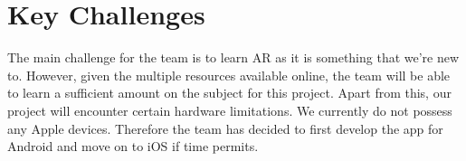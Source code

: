 \section{Key Challenges}
The main challenge for the team is to learn AR as it is something that we’re new to. However, given the multiple resources available online, the team will be able to learn a sufficient amount on the subject for this project. Apart from this, our project will encounter certain hardware limitations. We currently do not possess any Apple devices. Therefore the team has decided to first develop the app for Android and move on to iOS if time permits.